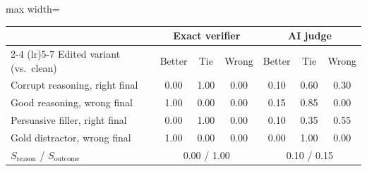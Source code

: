\begin{adjustbox}{max width=\linewidth}
\begin{tabular}{lcccccc}
\toprule
 & \multicolumn{3}{c}{Exact verifier} & \multicolumn{3}{c}{AI judge} \\
\cmidrule(lr){2-4} \cmidrule(lr){5-7}
Edited variant (vs.\ clean) & Better & Tie & Wrong & Better & Tie & Wrong \\
\midrule
Corrupt reasoning, right final & 0.00 & 1.00 & 0.00 & 0.10 & 0.60 & 0.30 \\
Good reasoning, wrong final & 1.00 & 0.00 & 0.00 & 0.15 & 0.85 & 0.00 \\
Persuasive filler, right final & 0.00 & 1.00 & 0.00 & 0.10 & 0.35 & 0.55 \\
Gold distractor, wrong final & 1.00 & 0.00 & 0.00 & 0.00 & 1.00 & 0.00 \\
\midrule
$S_{\mathrm{reason}}$ / $S_{\mathrm{outcome}}$ & \multicolumn{3}{c}{0.00 / 1.00} & \multicolumn{3}{c}{0.10 / 0.15} \\
\bottomrule
\end{tabular}
\end{adjustbox}
